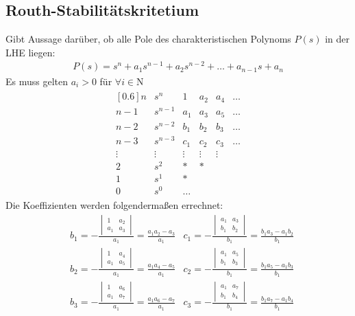 \subsection{Routh-Stabilitätskritetium}
\begin{tcolorbox}[colback=white!10!white,colframe=green!30!black,title=Routh Kriterium] 
    Gibt Aussage darüber, ob alle Pole des charakteristischen Polynoms $P(s)$ in der LHE liegen:
    \begin{align*}
        P(s) = s^n + a_1s^{n-1}+a_2s^{n-2}+\ldots + a_{n-1}s+a_n
    \end{align*}
    Es muss gelten $a_i > 0$ für $\forall i \in \mathrm{N}$
    \begin{align*}
        \begin{matrix}[0.6]
        n & s^n & 1 & a_2 & a_4 & \ldots \\
        n-1 & s^{n-1} & a_1 & a_3 & a_5 & \ldots \\
        n-2 & s^{n-2} & b_1 & b_2 & b_3 & \ldots \\        
        n-3 & s^{n-3} & c_1 & c_2 & c_3 & \ldots \\
        \vdots & \vdots & \vdots & \vdots & \vdots  \\
        2 & s^2 & * & *  \\
        1 & s^1 & * \\
        0 & s^0 & \ldots
        \end{matrix}
    \end{align*}
    Die Koeffizienten werden folgendermaßen errechnet:
    \begin{align*}
        & b_1 = -\frac{\begin{vmatrix}
            1 & a_2 \\ a_1 & a_3
            \end{vmatrix}}{a_1} = \frac{a_1a_2-a_3}{a_1} & c_1 = -\frac{\begin{vmatrix}
            a_1 & a_3 \\ b_1 & b_2
            \end{vmatrix}}{b_1} = \frac{b_1a_3-a_1b_2}{b_1}\\
        & b_2 = -\frac{\begin{vmatrix}
            1 & a_4 \\ a_1 & a_5
            \end{vmatrix}}{a_1} = \frac{a_1a_4-a_5}{a_1} & c_2 = -\frac{\begin{vmatrix}
            a_1 & a_5 \\ b_1 & b_3
            \end{vmatrix}}{b_1} = \frac{b_1a_5-a_1b_3}{b_1}\\
        & b_3 = -\frac{\begin{vmatrix}
            1 & a_6 \\ a_1 & a_7
            \end{vmatrix}}{a_1} = \frac{a_1a_6-a_7}{a_1} & c_3 = -\frac{\begin{vmatrix}
            a_1 & a_7 \\ b_1 & b_4
            \end{vmatrix}}{b_1} = \frac{b_1a_7-a_1b_4}{b_1}
    \end{align*}
    

\end{tcolorbox}
